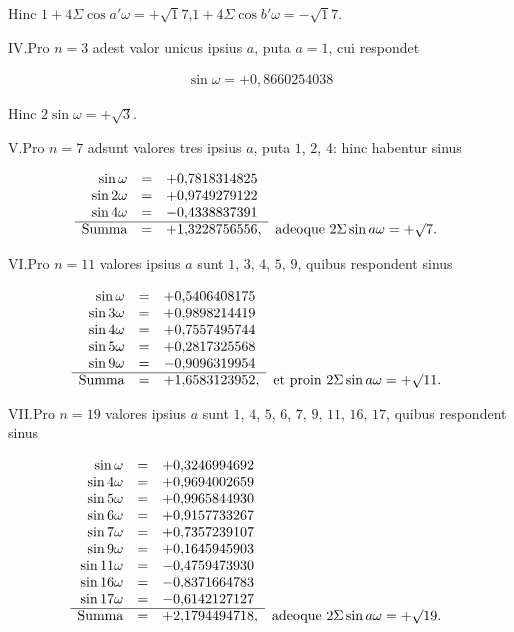 Hinc $1+4\Sigma\cos a'\omega=+\surd17$,\quad $1+4\Sigma\cos b'\omega=-\surd17$.

IV.\quad Pro $n=3$ adest valor unicus ipsius $a$, puta $a=1$, cui respondet

\[
\begin{aligned}
\sin\omega=+0{,}8660254038
\end{aligned}
\]

Hinc $2\sin\omega=+\surd3$.

V.\quad Pro $n=7$ adsunt valores tres ipsius $a$, puta $1$, $2$, $4$: hinc habentur sinus

{\small\setlength{\arraycolsep}{2.5pt}\renewcommand{\arraystretch}{1.15}
\[
\begin{array}{rcll}
\sin\omega&=&+0{,}7818314825&\\
\sin2\omega&=&+0{,}9749279122&\\
\sin4\omega&=&-0{,}4338837391&\\\cline{1-3}
\text{Summa}&=&+1{,}3228756556,&\text{adeoque }2\Sigma\sin a\omega=+\surd7.
\end{array}
\]
}

VI.\quad Pro $n=11$ valores ipsius $a$ sunt $1$, $3$, $4$, $5$, $9$, quibus respondent sinus

{\small\setlength{\arraycolsep}{2.5pt}\renewcommand{\arraystretch}{1.15}
\[
\begin{array}{rcll}
\sin\omega&=&+0{,}5406408175&\\
\sin3\omega&=&+0{,}9898214419&\\
\sin4\omega&=&+0{,}7557495744&\\
\sin5\omega&=&+0{,}2817325568&\\
\sin9\omega&=&-0{,}9096319954&\\\cline{1-3}
\text{Summa}&=&+1{,}6583123952,&\text{et proin }2\Sigma\sin a\omega=+\surd11.
\end{array}
\]
}

VII.\quad Pro $n=19$ valores ipsius $a$ sunt $1$, $4$, $5$, $6$, $7$, $9$, $11$, $16$, $17$, quibus respondent sinus

{\small\setlength{\arraycolsep}{2.5pt}\renewcommand{\arraystretch}{1.15}
\[
\begin{array}{rcll}
\sin\omega&=&+0{,}3246994692&\\
\sin4\omega&=&+0{,}9694002659&\\
\sin5\omega&=&+0{,}9965844930&\\
\sin6\omega&=&+0{,}9157733267&\\
\sin7\omega&=&+0{,}7357239107&\\
\sin9\omega&=&+0{,}1645945903&\\
\sin11\omega&=&-0{,}4759473930&\\
\sin16\omega&=&-0{,}8371664783&\\
\sin17\omega&=&-0{,}6142127127&\\\cline{1-3}
\text{Summa}&=&+2{,}1794494718,&\text{adeoque }2\Sigma\sin a\omega=+\surd19.
\end{array}
\]
}

